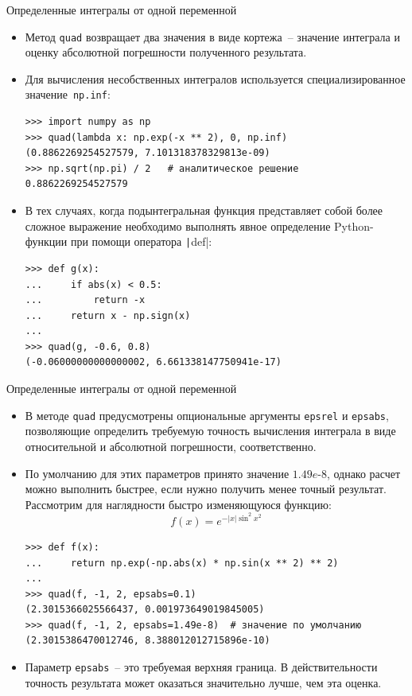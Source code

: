 \documentclass[aspectratio=169, mathserif]{beamer}	%
\begin{document}
\begin{frame}[fragile, label=c]{Определенные интегралы от одной переменной}
\scriptsize
\begin{itemize}
	\item Метод \texttt{quad} возвращает два значения в виде кортежа~-- значение интеграла и оценку абсолютной погрешности полученного результата.
	\item Для вычисления несобственных интегралов используется специализированное значение~\texttt{np.inf}:
\vfill
\begin{verbatim}
>>> import numpy as np
>>> quad(lambda x: np.exp(-x ** 2), 0, np.inf)
(0.8862269254527579, 7.101318378329813e-09)
>>> np.sqrt(np.pi) / 2   # аналитическое решение
0.8862269254527579
\end{verbatim}
\vfill
	\item В тех случаях, когда подынтегральная функция представляет собой более сложное выражение необходимо выполнять явное определение Python-функции при помощи оператора \texttt|def|:
\vfill
\begin{verbatim}
>>> def g(x):
...     if abs(x) < 0.5:
...         return -x
...     return x - np.sign(x)
...
>>> quad(g, -0.6, 0.8)
(-0.06000000000000002, 6.661338147750941e-17)
\end{verbatim}
\end{itemize}
\vfill
\end{frame}

\begin{frame}[fragile, label=c]{Определенные интегралы от одной переменной}
\scriptsize
\begin{itemize}
	\item В методе \texttt{quad} предусмотрены опциональные аргументы \texttt{epsrel} и \texttt{epsabs}, позволяющие определить требуемую точность вычисления интеграла в виде относительной и абсолютной погрешности, соответственно.
	\item По умолчанию для этих параметров принято значение $1.49e\text{-}8$, однако расчет можно выполнить быстрее, если нужно получить менее точный результат.
	Рассмотрим для наглядности быстро изменяющуюся функцию:
\vfill
$$
	f(x) = e^{-|x|\sin^2x^2}
$$
\vfill
\begin{verbatim}
>>> def f(x):
...     return np.exp(-np.abs(x) * np.sin(x ** 2) ** 2)
...
>>> quad(f, -1, 2, epsabs=0.1)
(2.3015366025566437, 0.001973649019845005)
>>> quad(f, -1, 2, epsabs=1.49e-8)  # значение по умолчанию
(2.3015386470012746, 8.388012012715896e-10)
\end{verbatim}
\vfill
	\item Параметр \texttt{epsabs}~-- это требуемая верхняя граница. В действительности точность результата может оказаться значительно лучше, чем эта оценка.
\end{itemize}
\vfill
\end{frame}
\end{document}
